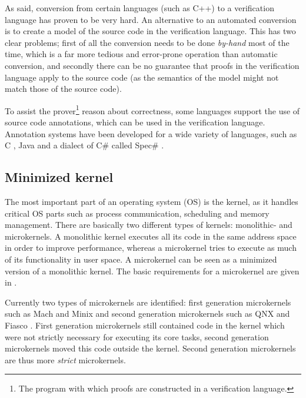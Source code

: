As said, conversion from certain languages (such as C++) to a verification language has proven to be very hard. An alternative to an automated conversion is to create a model of the source code in the verification language. This has two clear problems; first of all the conversion needs to be done \textit{by-hand} most of the time, which is a far more tedious and error-prone operation than automatic conversion, and secondly there can be no guarantee that proofs in the verification language apply to the source code (as the semantics of the model might not match those of the source code).\emptyline

To assist the prover\footnote{The program with which proofs are constructed in a verification language.} reason about correctness, some languages support the use of source code annotations, which can be used in the verification language. Annotation systems have been developed for a wide variety of languages, such as C \cite{david94lclint}, Java \cite{leavens99jml,hensel98reasoning} and a dialect of C\# called Spec\# \cite{barnett04spec}.

\subsection{Minimized kernel}
The most important part of an operating system (OS) is the kernel, as it handles critical OS parts such as process communication, scheduling and memory management. There are basically two different types of kernels: monolithic- and microkernels. A monolithic kernel executes all its code in the same address space in order to improve performance, whereas a microkernel tries to execute as much of its functionality in user space. A microkernel can be seen as a minimized version of a monolithic kernel. The basic requirements for a microkernel are given in \cite{liedtke95kernel}.\emptyline

Currently two types of microkernels are identified: first generation microkernels such as Mach \cite{rashid89mach} and Minix \cite{herder06minix} and second generation microkernels such as QNX \cite{hildebrand92architectural} and Fiasco \cite{hohmuth03applying}. First generation microkernels still contained code in the kernel which were not strictly necessary for executing its core tasks, second generation microkernels moved this code outside the kernel. Second generation microkernels are thus more \textit{strict} microkernels.\emptyline


